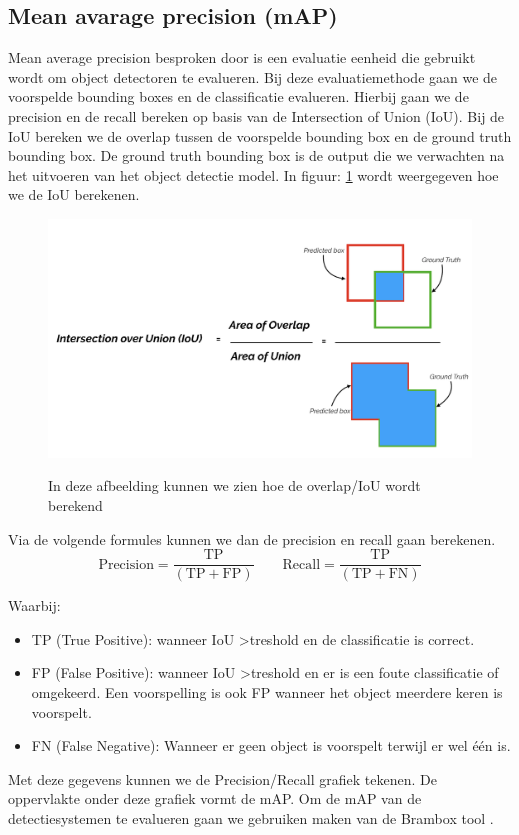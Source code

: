 \subsection{Mean avarage precision (mAP)} \label{map}
Mean average precision besproken door \cite{Yohanandan_map_2020} is een evaluatie eenheid die gebruikt wordt om object detectoren te evalueren.
Bij deze evaluatiemethode gaan we de voorspelde bounding boxes en de classificatie evalueren.
Hierbij gaan we de precision en de recall bereken op basis van de Intersection of Union (IoU).
Bij de IoU bereken we de overlap tussen de voorspelde bounding box en de ground truth bounding box.
De ground truth bounding box is de output die we verwachten na het uitvoeren van het object detectie model.
In figuur: \ref{fig:iou} wordt weergegeven hoe we de IoU berekenen.

\begin{figure}[!ht]
	\centering
	\includegraphics[width=0.80\linewidth]{fig/iou.png}
	\caption{In deze afbeelding kunnen we zien hoe de overlap/IoU wordt berekend}
	\label{fig:iou}
	\cite{Yohanandan_map_2020}
\end{figure}

Via de volgende formules kunnen we dan de precision en recall gaan berekenen.
\begin{equation}
	\textrm{Precision}  = \frac{\textrm{TP}}{(\textrm{TP} + \textrm{FP})} \qquad
	\textrm{Recall}  = \frac{\textrm{TP}}{(\textrm{TP} + \textrm{FN})}
\end{equation}

Waarbij:
\begin{itemize}
	\item TP (True Positive): wanneer IoU \textgreater treshold en de classificatie is correct.
	\item FP (False Positive): wanneer IoU \textgreater treshold en er is een foute classificatie of omgekeerd. Een voorspelling is ook FP wanneer het object meerdere keren is voorspelt.
	\item FN (False Negative): Wanneer er geen object is voorspelt terwijl er wel \'e\'en is.
\end{itemize}

Met deze gegevens kunnen we de Precision/Recall grafiek tekenen.
De oppervlakte onder deze grafiek vormt de mAP.
Om de mAP van de detectiesystemen te evalueren gaan we gebruiken maken van de Brambox tool \cite{eavise_eavise_2020}.

